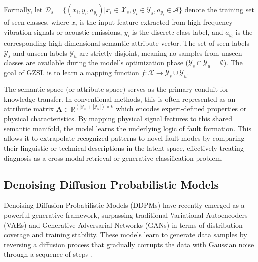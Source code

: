 \documentclass[journal]{IEEEtran}
\begin{document}
Formally, let $\mathcal{D}_s = \{(x_i, y_i, a_{y_i}) | x_i \in \mathcal{X}_s, y_i \in \mathcal{Y}_s, a_{y_i} \in \mathcal{A}\}$ denote the training set of seen classes, where $x_i$ is the input feature extracted from high-frequency vibration signals or acoustic emissions, $y_i$ is the discrete class label, and $a_{y_i}$ is the corresponding high-dimensional semantic attribute vector. The set of seen labels $\mathcal{Y}_s$ and unseen labels $\mathcal{Y}_u$ are strictly disjoint, meaning no samples from unseen classes are available during the model's optimization phase ($\mathcal{Y}_s \cap \mathcal{Y}_u = \emptyset$). The goal of GZSL is to learn a mapping function $f: \mathcal{X} \to \mathcal{Y}_s \cup \mathcal{Y}_u$.

The semantic space (or attribute space) serves as the primary conduit for knowledge transfer. In conventional methods, this is often represented as an attribute matrix $\mathbf{A} \in \mathbb{R}^{(|\mathcal{Y}_s| + |\mathcal{Y}_u|) \times k}$ which encodes expert-defined properties or physical characteristics. By mapping physical signal features to this shared semantic manifold, the model learns the underlying logic of fault formation. This allows it to extrapolate recognized patterns to novel fault modes by comparing their linguistic or technical descriptions in the latent space, effectively treating diagnosis as a cross-modal retrieval or generative classification problem.

\subsection{Denoising Diffusion Probabilistic Models}
\label{subsec:ddpm}

Denoising Diffusion Probabilistic Models (DDPMs) have recently emerged as a powerful generative framework, surpassing traditional Variational Autoencoders (VAEs) and Generative Adversarial Networks (GANs) in terms of distribution coverage and training stability. These models learn to generate data samples by reversing a diffusion process that gradually corrupts the data with Gaussian noise through a sequence of steps \cite{ho2020denoising}.
\end{document}
